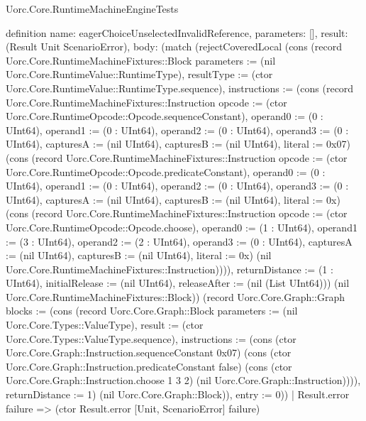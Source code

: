 \begin{lexlean}{Uorc.Core.RuntimeMachineEngineTests}
\begin{semanticmodule}
definition{
  name: eagerChoiceUnselectedInvalidReference,
  parameters: [],
  result: (Result Unit ScenarioError),
  body: (match (rejectCoveredLocal (cons (record Uorc.Core.RuntimeMachineFixtures::Block {parameters := (nil Uorc.Core.RuntimeValue::RuntimeType), resultType := (ctor Uorc.Core.RuntimeValue::RuntimeType.sequence), instructions := (cons (record Uorc.Core.RuntimeMachineFixtures::Instruction {opcode := (ctor Uorc.Core.RuntimeOpcode::Opcode.sequenceConstant), operand0 := (0 : UInt64), operand1 := (0 : UInt64), operand2 := (0 : UInt64), operand3 := (0 : UInt64), capturesA := (nil UInt64), capturesB := (nil UInt64), literal := 0x07}) (cons (record Uorc.Core.RuntimeMachineFixtures::Instruction {opcode := (ctor Uorc.Core.RuntimeOpcode::Opcode.predicateConstant), operand0 := (0 : UInt64), operand1 := (0 : UInt64), operand2 := (0 : UInt64), operand3 := (0 : UInt64), capturesA := (nil UInt64), capturesB := (nil UInt64), literal := 0x}) (cons (record Uorc.Core.RuntimeMachineFixtures::Instruction {opcode := (ctor Uorc.Core.RuntimeOpcode::Opcode.choose), operand0 := (1 : UInt64), operand1 := (3 : UInt64), operand2 := (2 : UInt64), operand3 := (0 : UInt64), capturesA := (nil UInt64), capturesB := (nil UInt64), literal := 0x}) (nil Uorc.Core.RuntimeMachineFixtures::Instruction)))), returnDistance := (1 : UInt64), initialRelease := (nil UInt64), releaseAfter := (nil (List UInt64))}) (nil Uorc.Core.RuntimeMachineFixtures::Block)) (record Uorc.Core.Graph::Graph {blocks := (cons (record Uorc.Core.Graph::Block {parameters := (nil Uorc.Core.Types::ValueType), result := (ctor Uorc.Core.Types::ValueType.sequence), instructions := (cons (ctor Uorc.Core.Graph::Instruction.sequenceConstant 0x07) (cons (ctor Uorc.Core.Graph::Instruction.predicateConstant false) (cons (ctor Uorc.Core.Graph::Instruction.choose 1 3 2) (nil Uorc.Core.Graph::Instruction)))), returnDistance := 1}) (nil Uorc.Core.Graph::Block)), entry := 0}))
    | Result.error failure => (ctor Result.error [Unit, ScenarioError] failure)
}
\end{semanticmodule}
\end{lexlean}

